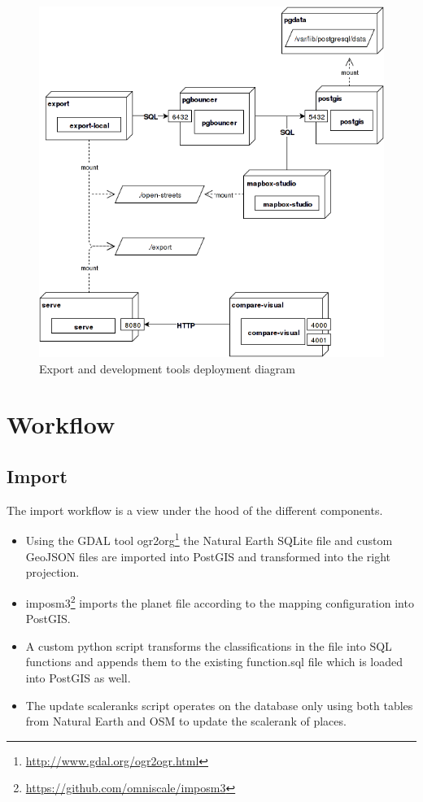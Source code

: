 \begin{figure}[H]
\centering
  \includegraphics[scale=0.6]{images/deployment_dev_export.png}
  \caption{Export and development tools deployment diagram}
\end{figure}

\newpage
\section{Workflow}\label{workflow}

\subsection{Import}\label{workflow-import}

The import workflow is a view under the hood of the different components.

\begin{itemize}
\item Using the GDAL tool ogr2org\footnote{\url{http://www.gdal.org/ogr2ogr.html}} the Natural Earth SQLite file and custom GeoJSON files are imported into PostGIS and transformed into the right projection.
\item imposm3\footnote{\url{https://github.com/omniscale/imposm3}} imports the planet file according to the mapping configuration into PostGIS.
\item A custom python script transforms the classifications in the file into SQL functions and appends them to the existing function.sql file which is loaded into PostGIS as well.
\item The update scaleranks script operates on the database only using both tables from Natural Earth and OSM to update the scalerank of places.
\end{itemize}

